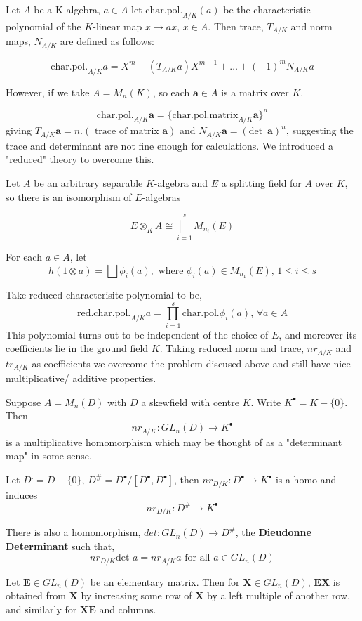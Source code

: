Let $A$ be a K-algebra, $a\in A$ let $\text{char.pol.}_{A/K}(a)$ be the characteristic polynomial of the $K$-linear map $x\rightarrow ax,\, x\in A$. Then trace, $T_{A/K}$ and norm maps, $N_{A/K}$ are defined as follows: 

$$\text{char.pol.}_{A/K} a = X^m - (T_{A/K} a)X^{m-1} + \dots + (-1)^m N_{A/K}a$$

However, if we take $A=M_n(K)$, so each $\mathbf a\in A$ is a matrix over $K$.

$$\text{char.pol.}_{A/K} \mathbf a = \{\text{char.pol.matrix}_{A/K} \mathbf a\}^n$$
giving $T_{A/K} \mathbf a = n. (\text{ trace of matrix } \mathbf a)$ and $N_{A/K} \mathbf a = (\text{det }\, \mathbf a)^n$, suggesting the trace and determinant are not fine enough for calculations. We introduced a "reduced" theory to overcome this.

Let $A$ be an arbitrary separable $K$-algebra and $E$ a splitting field for $A$ over $K$, so there is an isomorphism of $E$-algebras

$$E\otimes_K A\cong  \bigsqcup_{i=1}^s M_{n_i}(E)$$

For each $a\in A$, let
$$h(1\otimes a) = \bigsqcup \phi_i(a),\text{ where } \phi_i(a)\in M_{n_1}(E), \, 1\leq i\leq s$$

Take reduced characterisitc polynomial to be,
$$\text{red.char.pol.}_{A/K} a = \prod_{i=1}^s \text{char.pol.} \phi_i(a), \, \forall a\in A$$
This polynomial turns out to be independent of the choice of $E$, and moreover its coefficients lie in the ground field $K$. Taking reduced norm and trace, $nr_{A/K}$ and $tr_{A/K}$ as coefficients we overcome the problem discused above and still have nice multiplicative/ additive properties.

Suppose $A=M_n(D)$ with $D$ a skewfield with centre $K$. Write $K^\bullet = K - \{ 0 \}$. Then 
$$nr_{A/K}:GL_n(D) \rightarrow K^\bullet$$
is a multiplicative homomorphism which may be thought of as a "determinant map" in some sense.

Let $D^. = D-\{ 0\},\, D^{\#} = D^\bullet / [D^\bullet , D^\bullet ]$, then $nr_{D/K}:D^\bullet \rightarrow K^\bullet$ is a homo and induces
$$nr_{D/K} : D^{\#} \rightarrow K^\bullet$$

There is also a homomorphism, $det: GL_n(D)\rightarrow D^{\#}$, the \textbf{Dieudonne Determinant} such that,
$$nr_{D/K} \text{det } a = nr_{A/K} a \text{ for all } a \in GL_n(D)$$

Let $\mathbf E\in GL_n(D)$ be an elementary matrix. Then for $\mathbf X\in GL_n(D)$, $\mathbf{EX}$ is obtained from $\mathbf X$ by increasing some row of $\mathbf X$ by a left multiple of another row, and similarly for $\mathbf{XE}$ and columns.

